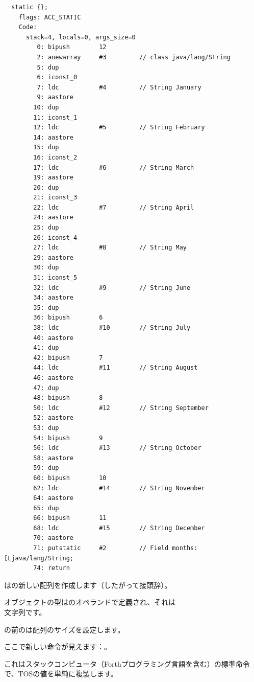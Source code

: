 \begin{lstlisting}
  static {};
    flags: ACC_STATIC
    Code:
      stack=4, locals=0, args_size=0
         0: bipush        12
         2: anewarray     #3         // class java/lang/String
         5: dup           
         6: iconst_0      
         7: ldc           #4         // String January
         9: aastore       
        10: dup           
        11: iconst_1      
        12: ldc           #5         // String February
        14: aastore       
        15: dup           
        16: iconst_2      
        17: ldc           #6         // String March
        19: aastore       
        20: dup           
        21: iconst_3      
        22: ldc           #7         // String April
        24: aastore       
        25: dup           
        26: iconst_4      
        27: ldc           #8         // String May
        29: aastore       
        30: dup           
        31: iconst_5      
        32: ldc           #9         // String June
        34: aastore       
        35: dup           
        36: bipush        6
        38: ldc           #10        // String July
        40: aastore       
        41: dup           
        42: bipush        7
        44: ldc           #11        // String August
        46: aastore       
        47: dup           
        48: bipush        8
        50: ldc           #12        // String September
        52: aastore       
        53: dup           
        54: bipush        9
        56: ldc           #13        // String October
        58: aastore       
        59: dup           
        60: bipush        10
        62: ldc           #14        // String November
        64: aastore       
        65: dup           
        66: bipush        11
        68: ldc           #15        // String December
        70: aastore       
        71: putstatic     #2         // Field months:[Ljava/lang/String;
        74: return        
\end{lstlisting}

はの新しい配列を作成します（したがって接頭辞）。

オブジェクトの型はのオペランドで定義され、それは\\
文字列です。

の前のは配列のサイズを設定します。

ここで新しい命令が見えます：。


これはスタックコンピュータ（Forthプログラミング言語を含む）の標準命令で、\ac{TOS}の値を単純に複製します。

